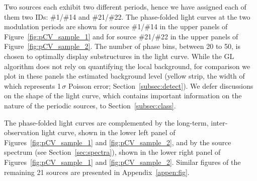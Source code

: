 \documentclass[fleqn,usenatbib]{mnras}
\begin{document}
Two sources each exhibit two different periods, hence we have assigned each of them two IDs: \#1/\#14 and \#21/\#22.  
The phase-folded light curves at the two modulation periods are shown for source \#1/\#14 in the upper panels of  Figure~\ref{fig:pCV_sample_1} and for source \#21/\#22 in the upper panels of Figure~\ref{fig:pCV_sample_2}. 
The number of phase bins, between 20 to 50, is chosen to optimally display substructures in the light curve. While the GL algorithm does not rely on quantifying the local background, for comparison we plot in these panels the estimated background level (yellow strip, the width of which represents 1\,$\sigma$ Poisson error; Section~\ref{subsec:detect}). 
We defer discussions on the shape of the light curve, which contains important information on the nature of the periodic sources, to Section~\ref{subsec:class}. 
 
The phase-folded light curves are complemented by the long-term, inter-observation light curve, shown in the lower left panel of Figures~\ref{fig:pCV_sample_1} and \ref{fig:pCV_sample_2}, 
and by the source spectrum (see Section~\ref{sec:spectra}),
shown in the lower right panel of Figures~\ref{fig:pCV_sample_1} and \ref{fig:pCV_sample_2}. 
Similar figures of the remaining 21 sources are presented in Appendix~\ref{appen:fig}.
\end{document}
